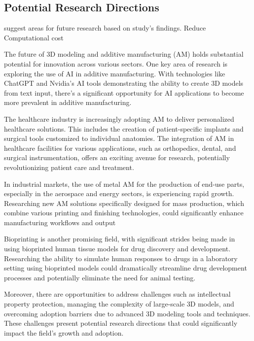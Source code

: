 \subsection{Potential Research Directions}
suggest areas for future research based on study's findings.
Reduce Computational cost

The future of 3D modeling and additive manufacturing (AM) holds substantial potential for innovation across various sectors. One key area of research is exploring the use of AI in additive manufacturing. With technologies like ChatGPT and Nvidia's AI tools demonstrating the ability to create 3D models from text input, there's a significant opportunity for AI applications to become more prevalent in additive manufacturing.

The healthcare industry is increasingly adopting AM to deliver personalized healthcare solutions. This includes the creation of patient-specific implants and surgical tools customized to individual anatomies. The integration of AM in healthcare facilities for various applications, such as orthopedics, dental, and surgical instrumentation, offers an exciting avenue for research, potentially revolutionizing patient care and treatment.

In industrial markets, the use of metal AM for the production of end-use parts, especially in the aerospace and energy sectors, is experiencing rapid growth. Researching new AM solutions specifically designed for mass production, which combine various printing and finishing technologies, could significantly enhance manufacturing workflows and output

Bioprinting is another promising field, with significant strides being made in using bioprinted human tissue models for drug discovery and development. Researching the ability to simulate human responses to drugs in a laboratory setting using bioprinted models could dramatically streamline drug development processes and potentially eliminate the need for animal testing.

Moreover, there are opportunities to address challenges such as intellectual property protection, managing the complexity of large-scale 3D models, and overcoming adoption barriers due to advanced 3D modeling tools and techniques. These challenges present potential research directions that could significantly impact the field's growth and adoption.
